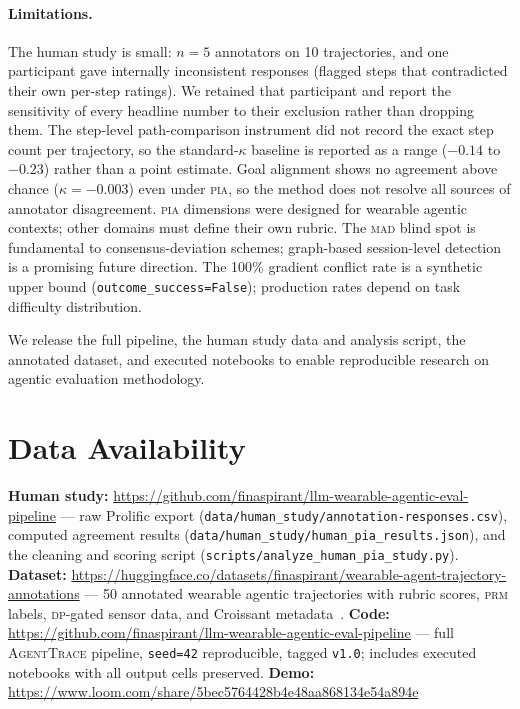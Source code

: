 \documentclass{article}
\newcommand{\PIA}{\textsc{pia}}          %
\newcommand{\AgentTrace}{\textsc{AgentTrace}}
\begin{document}
\paragraph{Limitations.}
The human study is small: $n=5$ annotators on 10 trajectories, and one
participant gave internally inconsistent responses (flagged steps that
contradicted their own per-step ratings). We retained that participant and
report the sensitivity of every headline number to their exclusion rather
than dropping them. The step-level path-comparison instrument did not record
the exact step count per trajectory, so the standard-$\kappa$ baseline is
reported as a range ($-0.14$ to $-0.23$) rather than a point estimate.
Goal alignment shows no agreement above chance ($\kappa = -0.003$) even under
\PIA{}, so the method does not resolve all sources of annotator disagreement.
\PIA{} dimensions were designed for wearable agentic contexts; other domains
must define their own rubric.
The \textsc{mad} blind spot is fundamental to consensus-deviation schemes;
graph-based session-level detection is a promising future direction.
The 100\% gradient conflict rate is a synthetic upper bound
(\texttt{outcome\_success=False}); production rates depend on task difficulty
distribution.

We release the full pipeline, the human study data and analysis script, the
annotated dataset, and executed notebooks to enable reproducible research on
agentic evaluation methodology.

\section*{Data Availability}

\textbf{Human study:} \url{https://github.com/finaspirant/llm-wearable-agentic-eval-pipeline} — raw Prolific export (\texttt{data/human\_study/annotation-responses.csv}), computed agreement results (\texttt{data/human\_study/human\_pia\_results.json}), and the cleaning and scoring script (\texttt{scripts/analyze\_human\_pia\_study.py}).
\textbf{Dataset:} \url{https://huggingface.co/datasets/finaspirant/wearable-agent-trajectory-annotations} — 50 annotated wearable agentic trajectories with rubric scores, \textsc{prm} labels, \textsc{dp}-gated sensor data, and Croissant metadata~\cite{croissant2024}.
\textbf{Code:} \url{https://github.com/finaspirant/llm-wearable-agentic-eval-pipeline} — full \AgentTrace{} pipeline, \texttt{seed=42} reproducible, tagged \texttt{v1.0}; includes executed notebooks with all output cells preserved.
\textbf{Demo:} \url{https://www.loom.com/share/5bec5764428b4e48aa868134e54a894e}
\end{document}
